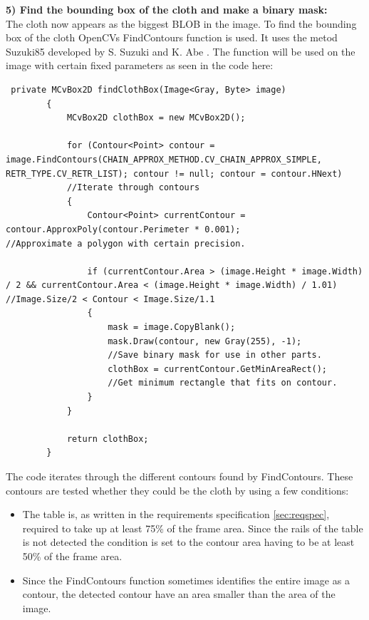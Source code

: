 \textbf{5) Find the bounding box of the cloth and make a binary mask:}\\
The cloth now appears as the biggest BLOB in the image. To find the bounding box of the cloth OpenCVs \cite{opencv} FindContours function is used. It uses the metod Suzuki85 developed by S. Suzuki and K. Abe \cite{contour}. The function will be used on the image with certain fixed parameters as seen in the code here:

\begin{lstlisting}
 private MCvBox2D findClothBox(Image<Gray, Byte> image)
        {
            MCvBox2D clothBox = new MCvBox2D();

            for (Contour<Point> contour = image.FindContours(CHAIN_APPROX_METHOD.CV_CHAIN_APPROX_SIMPLE, RETR_TYPE.CV_RETR_LIST); contour != null; contour = contour.HNext)  
            //Iterate through contours
            {
                Contour<Point> currentContour = contour.ApproxPoly(contour.Perimeter * 0.001);                                           //Approximate a polygon with certain precision.

                if (currentContour.Area > (image.Height * image.Width) / 2 && currentContour.Area < (image.Height * image.Width) / 1.01)  //Image.Size/2 < Contour < Image.Size/1.1
                {
                    mask = image.CopyBlank();
                    mask.Draw(contour, new Gray(255), -1);
                    //Save binary mask for use in other parts.
                    clothBox = currentContour.GetMinAreaRect();                                                                          
                    //Get minimum rectangle that fits on contour.
                }
            }

            return clothBox;
        }
\end{lstlisting}

The code iterates through the different contours found by FindContours. These contours are tested whether they could be the cloth by using a few conditions:

\begin{itemize}
\setlength{\itemsep}{0mm}
	\item The table is, as written in the requirements specification \ref{sec:reqspec}, required to take up at least 75\% of the frame area. Since the rails of the table is not detected the condition is set to the contour area having to be at least 50\% of the frame area. 
	\item Since the FindContours function sometimes identifies the entire image as a contour, the detected contour have an area smaller than the area of the image.
\end{itemize}

